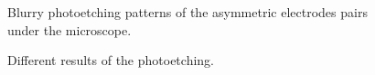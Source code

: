 \documentclass[journal,svgnames,twocolumn,x11names]{IEEEtran}
\begin{document}
\begin{enumerate}
    \begin{figure}[H]
    	\centering
    	\hspace{0.4in} %
    	\caption{Blurry photoetching patterns of the asymmetric electrodes pairs under the microscope.}
    	\label{blurry}
    \end{figure} %
    \begin{figure}[H]
    	\centering
    	\hspace{0.4in} %
    	\caption{Different results of the photoetching.}
    	\label{good figure}
    \end{figure} %
    

\end{enumerate}
\end{document}

